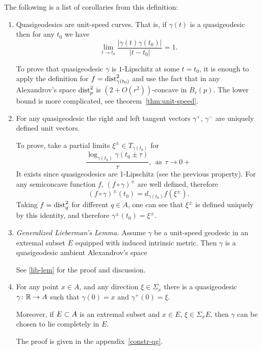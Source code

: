 \documentclass{article}
\begin{document}
The following is a list of corollaries from this definition:
\begin{enumerate}
\item Quasigeodesics are unit-speed curves.
That is, if $\gamma(t)$ is a quasigeodesic then for any $t_0$ we have 
$$ \lim_{t\to t_0}\frac{|\gamma(t)\gamma(t_0)|}{|t-t_0|}=1.$$ 

To prove that quasigeodesic $\gamma$ is $1$-Lipschitz at some $t=t_0$,
it is enough to apply the definition for $f=\operatorname{dist}_{\gamma(t_0)}^2$ and use the fact
that in any Alexandrov's space $\operatorname{dist}_p^2$ is $(2+O(r^2))$-concave in
$B_r(p)$.
The lower bound is more complicated, see theorem~\ref{thm:unit-speed}.

\item For any quasigeodesic the right and left tangent vectors $\gamma^+$,
$\gamma^-$ are uniquely defined unit vectors. 

To prove, take a partial limits $\xi^\pm\in T_{\gamma(t_0)}$ for
$$\frac{\log_{\gamma(t_0)}\gamma(t_0\pm\tau)}{\tau},\ \ \text{as}\ \ 
\tau\to0+$$
It exists since quasigeodesics are 1-Lipschitz (see the previous property).
For any semiconcave function $f$,  $(f\circ\gamma)^\pm$ are well defined,
therefore 
$$(f\circ\gamma)^\pm(t_0)=d_{\gamma(t_0)}f(\xi^\pm).$$
Taking $f=\operatorname{dist}_q^2$ for different $q\in A$, one can see that $\xi^\pm$ is
defined uniquely by this identity, and therefore $\gamma^\pm(t_0)=\xi^\pm$.

\item {\it Generalized Lieberman's Lemma.} Assume $\gamma$ be a unit-speed geodesic in an extremal subset $E$ equipped with induced intrinsic metric.
Then $\gamma$ is a quasigeodesic ambient
Alexandrov's space
\setcounter{extr-prop}{\value{enumi}}

See \ref{lib-lem} for the proof and discussion.

\item\label{exist-qg} For any point $x\in A$, and any direction $\xi\in \Sigma_x$
there is a quasigeodesic $\gamma\colon\mathbb{R}\to A$ such that $\gamma(0)=x$ and
$\gamma^+(0)=\xi$.

Moreover, if $E\subset A$ is an extremal subset and $x\in E$, $\xi\in \Sigma_x E$,
then $\gamma$ can be chosen to lie completely in $E$.

The proof is  given in the appendix~\ref{constr-qg}.

\setcounter{qg-prop}{\value{enumi}}
\end{enumerate}
 
\end{document}
